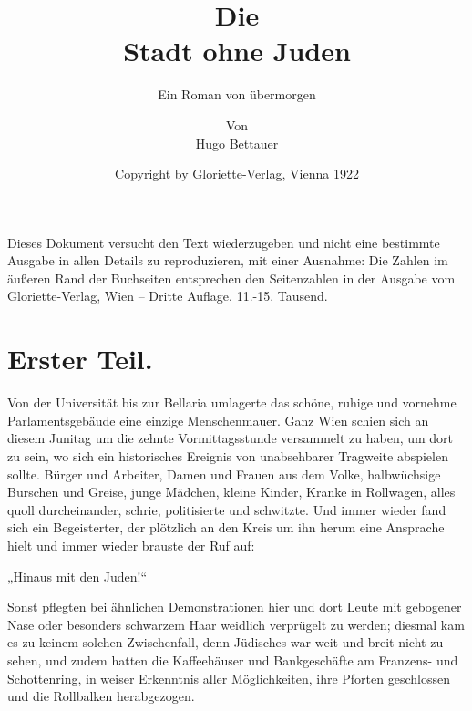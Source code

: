 Dieses Dokument versucht den Text wiederzugeben und nicht eine bestimmte
Ausgabe in allen Details zu reproduzieren, mit einer Ausnahme: Die
Zahlen im äußeren Rand der Buchseiten entsprechen den Seitenzahlen
in der Ausgabe vom Gloriette-Verlag, Wien -- Dritte Auflage. 11.-15. Tausend.

\title{Die\\Stadt ohne Juden}

\subtitle{Ein Roman von übermorgen}

\author{Von\\Hugo Bettauer}



\date{Copyright by Gloriette-Verlag, Vienna 1922}



\maketitle

\chapter{Erster Teil.}

Von der Universität bis zur Bellaria umlagerte das schöne, ruhige
und vornehme Parlamentsgebäude eine einzige Menschenmauer. Ganz
Wien schien sich an diesem Junitag um die zehnte Vormittagsstunde
versammelt zu haben, um dort zu sein, wo sich ein historisches
Ereignis von unabsehbarer Tragweite abspielen sollte. Bürger und
Arbeiter, Damen und Frauen aus dem Volke, halbwüchsige Burschen und
Greise, junge Mädchen, kleine Kinder, Kranke in Rollwagen, alles
quoll durcheinander, schrie, politisierte und schwitzte. Und immer
wieder fand sich ein Begeisterter, der plötzlich an den Kreis um
ihn herum eine Ansprache hielt und immer wieder brauste der Ruf
auf:

„Hinaus mit den Juden!“

Sonst pflegten bei ähnlichen Demonstrationen hier und dort Leute
mit gebogener Nase oder besonders schwarzem Haar weidlich
verprügelt zu werden; diesmal kam es zu keinem solchen
Zwischenfall, denn Jüdisches war weit und breit nicht zu sehen, und
zudem hatten die Kaffeehäuser und Bankgeschäfte am Franzens- und
Schottenring, in weiser Erkenntnis aller Möglichkeiten, ihre
Pforten geschlossen und die Rollbalken herabgezogen.

